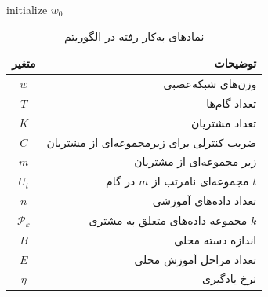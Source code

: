 \begin{LTR}
\begin{algorithm}[t]
	\begin{RTL}
		\caption{%
میانگین‌گیری فدرال
			\cite{mcmahan2017communication}
		}
		\label{algo_FedAvg}
	\end{RTL}
	
	\begin{latin}
		initialize $w_0$\;
	\end{latin}
\end{algorithm}
\end{LTR}


\begin{table}[h]
	\centering
	\caption{نمادهای به‌کار رفته در الگوریتم
	}
	\label{tabel_FedAvgNotations}
	\begin{tabular}{cr}
		\hline
		متغیر & توضیحات \\
		\hline
		$w$ & وزن‌های شبکه‌عصبی \\
		$T$ & تعداد گام‌ها \\
		$K$ & تعداد مشتریان \\
		$C$ & ضریب کنترلی برای زیرمجموعه‌ای از مشتریان \\
		$m$ & زیر مجموعه‌ای از مشتریان \\
		$U_t$ & مجموعه‌ای نامرتب از $m$ در گام $t$ \\
		$n$ & تعداد داده‌های آموزشی \\
		$\mathcal{P}_k$ & مجموعه داده‌های متعلق به مشتری $k$ \\
		$B$ & اندازه دسته محلی \\
		$E$ & تعداد مراحل آموزش محلی \\
		$\eta$ & نرخ یادگیری \\
		\hline
	\end{tabular}
\end{table}


